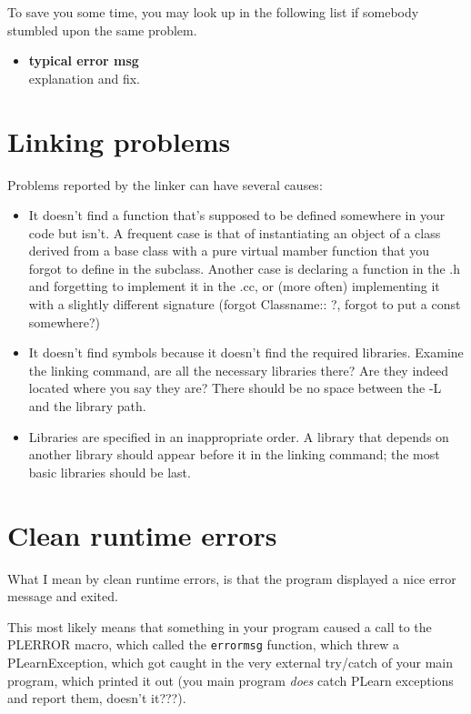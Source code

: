 \documentclass[11pt]{book}
\begin{document}
To save you some time, you may look up in the following list if
somebody stumbled upon the same problem.

\begin{itemize}

\item {\bf typical error msg } \\
explanation and fix.

\end{itemize}



\section{Linking problems}

Problems reported by the linker can have several causes:

\begin{itemize}
\item It doesn't find a function that's supposed to be defined somewhere in
  your code but isn't.  A frequent case is that of instantiating an object
  of a class derived from a base class with a pure virtual mamber function
  that you forgot to define in the subclass. Another case is declaring a
  function in the .h and forgetting to implement it in the .cc, or (more
  often) implementing it with a slightly different signature (forgot
  Classname:: ?, forgot to put a const somewhere?)
\item It doesn't find symbols because it doesn't find the required
  libraries. Examine the linking command, are all the necessary libraries there? Are they
  indeed located where you say they are? There should be no space between the
  -L and the library path.
\item Libraries are specified in an inappropriate order. A library that
  depends on another library should appear before it in the linking
  command; the most basic libraries should be last.
\end{itemize}



\section{Clean runtime errors}

What I mean by clean runtime errors, is that the program displayed a nice
error message and exited.

This most likely means that something in your program caused a call to the
PLERROR macro, which called the {\tt errormsg} function, which threw a
PLearnException, which got caught in the very external try/catch of your
main program, which printed it out (you main program {\em does} catch
PLearn exceptions and report them, doesn't it???).
\end{document}
